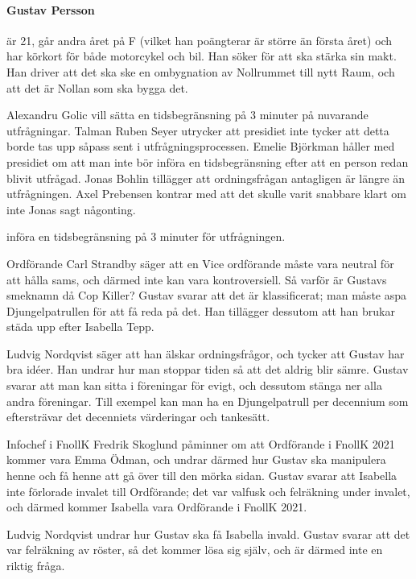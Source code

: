 \documentclass[hidelinks]{sektionsmote}
\begin{document}
\paragraph{Gustav Persson} är 21, går andra året på F (vilket han poängterar är större än första året) och har körkort för både motorcykel och bil.
Han söker för att ska stärka sin makt.
Han driver att det ska ske en ombygnation av Nollrummet till nytt Raum, och att det är Nollan som ska bygga det.
\begin{ofraga}
  Alexandru Golic vill sätta en tidsbegränsning på 3 minuter på nuvarande utfrågningar.
  Talman Ruben Seyer utrycker att presidiet inte tycker att detta borde tas upp såpass sent i utfrågningsprocessen.
  Emelie Björkman håller med presidiet om att man inte bör införa en tidsbegränsning efter att en person redan blivit utfrågad.
  Jonas Bohlin tillägger att ordningsfrågan antagligen är längre än utfrågningen.
  Axel Prebensen kontrar med att det skulle varit snabbare klart om inte Jonas sagt någonting.
  \begin{beslut}
    \item införa en tidsbegränsning på 3 minuter för utfrågningen.
  \end{beslut}
\end{ofraga}
Ordförande Carl Strandby säger att en Vice ordförande måste vara neutral för att hålla sams, och därmed inte kan vara kontroversiell.
Så varför är Gustavs smeknamn då Cop Killer?
Gustav svarar att det är klassificerat; man måste aspa Djungelpatrullen för att få reda på det.
Han tillägger dessutom att han brukar städa upp efter Isabella Tepp.\par
Ludvig Nordqvist säger att han älskar ordningsfrågor, och tycker att Gustav har bra idéer.
Han undrar hur man stoppar tiden så att det aldrig blir sämre.
Gustav svarar att man kan sitta i föreningar för evigt, och dessutom stänga ner alla andra föreningar.
Till exempel kan man ha en Djungelpatrull per decennium som eftersträvar det decenniets värderingar och tankesätt.\par
Infochef i FnollK Fredrik Skoglund påminner om att Ordförande i FnollK 2021 kommer vara Emma Ödman, och undrar därmed hur Gustav ska manipulera henne och få henne att gå över till den mörka sidan.
Gustav svarar att Isabella inte förlorade invalet till Ordförande; det var valfusk och felräkning under invalet, och därmed kommer Isabella vara Ordförande i FnollK 2021.\par
Ludvig Nordqvist undrar hur Gustav ska få Isabella invald.
Gustav svarar att det var felräkning av röster, så det kommer lösa sig själv, och är därmed inte en riktig fråga.
\end{document}
